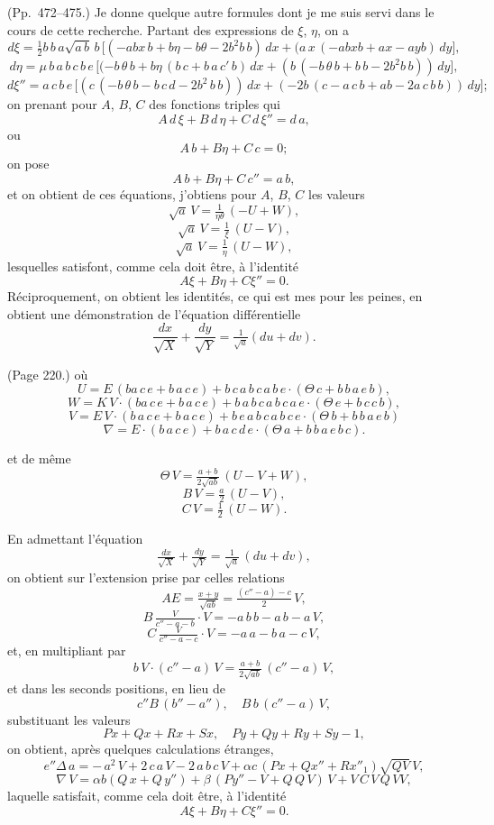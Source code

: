 \documentclass[11pt,a4paper]{book}
\begin{document}
\noindent (Pp.~472--475.) Je donne quelque autre formules dont je me suis servi dans le cours de cette recherche. Partant des expressions de $\xi$, $\eta$, on a
\[
d\xi = \tfrac{1}{2}b\,b\,a\sqrt{a\,b}\,b\,\big[(- a b x\,b + b\eta - b\theta - 2 b^2 b\,b)\,d x
+ (a\,x\,(- a b x b + ax - ay b)\,d y\big],
\]
\[
d\eta = \mu\,b\,a\,b\,c\,b\,e\,\big[(- b\,\theta\,b + b\eta\,(b\,c + b\,a\,c'\,b)\,d x
+ (b\,(- b\,\theta\,b + b\,b - 2 b^2 b\,b))\,d y\big],
\]
\[
d\xi'' = a\,c\,b\,e\,\big[(c\,(- b\,\theta\,b - b\,c\,d - 2 b^2\,b\,b))\,d x + (- 2 b\,(c - a\,c\,b + a b - 2 a\,c\,b\,b))\,d y\big];
\]
on prenant pour $A$, $B$, $C$ des fonctions triples qui
\[
A\,d\,\xi + B\,d\,\eta + C\,d\,\xi'' = d\,a,
\]
ou
\[
A\,b + B\eta + C\,c = 0;
\]
on pose
\[
A\,b + B\eta + C\,c'' = a\,b,
\]
et on obtient de ces \'equations, j'obtiens pour $A$, $B$, $C$ les valeurs
\[
\sqrt{a}\,V = \tfrac{1}{\eta\theta}\,(- U + W),
\]
\[
\sqrt{a}\,V = \tfrac{1}{\xi}\,(U - V),
\]
\[
\sqrt{a}\,V = \tfrac{1}{\eta}\,(U - W),
\]
lesquelles satisfont, comme cela doit \^etre, \`a l'identit\'e
\[
A\xi + B\eta + C\xi'' = 0.
\]
R\'eciproquement, on obtient les identit\'es, ce qui est mes pour les peines, en obtient une d\'emonstration de l'\'equation diff\'erentielle
\[
\frac{dx}{\sqrt{X}} + \frac{dy}{\sqrt{Y}} = \tfrac{1}{\sqrt{a}} (du + dv).
\]

\medskip

\noindent (Page 220.) o\`u
\[
U = E\,(ba\,c\,e + b\,a\,c\,e) + b\,c\,a\,b\,c\,a\,b\,e \cdot (\Theta\,c + b\,b\,a\,e\,b),
\]
\[
W = K\,V \cdot (ba\,c\,e + b\,a\,c\,e) + b\,a\,b\,c\,a\,b\,c\,a\,e \cdot (\Theta\,e + b\,c\,c\,b),
\]
\[
V = E\,V \cdot (b\,a\,c\,e + b\,a\,c\,e) + b\,e\,a\,b\,c\,a\,b\,c\,e \cdot (\Theta\,b + b\,b\,a\,e\,b)
\]
\[
\nabla = E \cdot (b\,a\,c\,e) + b\,a\,c\,d\,e \cdot (\Theta\,a + b\,b\,a\,e\,b\,c).
\]

et de m\^eme
\[
\Theta\,V = \tfrac{a + b}{2\sqrt{a b}}\,(U - V + W),
\]
\[
B\,V = \tfrac{a}{2}\,(U - V),
\]
\[
C\,V = \tfrac{1}{2}\,(U - W).
\]

En admettant l'\'equation
\[
\tfrac{dx}{\sqrt{X}} + \tfrac{dy}{\sqrt{Y}} = \tfrac{1}{\sqrt{a}}\,(du + dv),
\]
on obtient sur l'extension prise par celles relations
\[
A E = \tfrac{x + y}{\sqrt{a b}} = \tfrac{(c'' - a) - c}{2}\,V,
\]
\[
B\,\tfrac{V}{c'' - a - b} \cdot V = - a\,b\,b - a\,b - a\,V,
\]
\[
C\,\tfrac{V}{c'' - a - c} \cdot V = - a\,a - b\,a - c\,V,
\]
et, en multipliant par
\[
b\,V \cdot (c'' - a)\,V = \tfrac{a + b}{2\sqrt{a b}}\,(c'' - a)\,V,
\]
et dans les seconds positions, en lieu de
\[
c''B\,(b'' - a''),\quad B\,b\,(c'' - a)\,V,
\]
substituant les valeurs
\[
P x + Q x + R x + S x,\quad P y + Q y + R y + S y - 1,
\]
on obtient, apr\`es quelques calculations \'etranges,
\[
e''\Delta\,a = -\,a^2\,V + 2\,c\,a\,V - 2\,a\,b\,c\,V + \alpha c\,(P x + Q x'' + R x''_1)\sqrt{Q V}\,V,
\]
\[
\nabla\,V = \alpha b(Q\,x + Q\,y'') + \beta\,(P y'' - V + Q\,Q\,V)\,V + V\,C\,V\,Q\,V V,
\]
laquelle satisfait, comme cela doit \^etre, \`a l'identit\'e
\[
A\xi + B\eta + C\xi'' = 0.
\]
\end{document}
